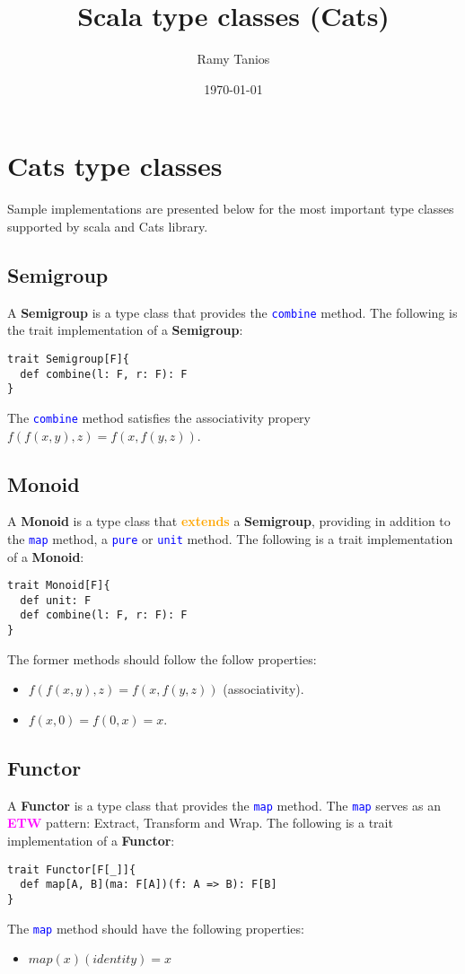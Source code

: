 \documentclass[11pt]{article}
\title{Scala type classes (Cats)}
\author{ Ramy Tanios }
\date{\today}
\newcommand\func[1]{\textcolor{blue}{\texttt{#1}}}
\begin{document}
\maketitle	
\pagebreak


\section{Cats type classes}
Sample implementations are presented below for the most important type classes supported by scala and Cats library.

\subsection{Semigroup}
A \textbf{Semigroup} is a type class that provides the \func{combine} method.
The following is the trait implementation of a \textbf{Semigroup}: 
\begin{lstlisting}[style=myScalastyle]
trait Semigroup[F]{ 
  def combine(l: F, r: F): F
}
\end{lstlisting}
The \func{combine} method satisfies the associativity propery $f(f(x,y), z) = f(x, f(y,z))$. 

\subsection{Monoid}
A \textbf{Monoid} is a type class that \textcolor{orange}{\textbf{extends}} a \textbf{Semigroup}, providing in addition to the 
\func{map} method, a \func{pure} or \func{unit} method. The following is a trait implementation of a \textbf{Monoid}: 
\begin{lstlisting}[style=myScalaStyle]
trait Monoid[F]{ 
  def unit: F 
  def combine(l: F, r: F): F
}
\end{lstlisting}
The former methods should follow the follow properties: 
\begin{itemize}
  \item $f(f(x,y), z) = f(x, f(y,z))$ (associativity). 
  \item $f(x, 0) = f(0, x) = x$. 
\end{itemize}



\subsection{Functor}
A \textbf{Functor} is a type class that provides the \func{map} method. 
The \func{map} serves as an \textcolor{magenta}{\textbf{ETW}} pattern: Extract, Transform and Wrap. The following 
is a trait implementation of a \textbf{Functor}: 
\begin{lstlisting}[style=myScalastyle]
trait Functor[F[_]]{ 
  def map[A, B](ma: F[A])(f: A => B): F[B]
}
\end{lstlisting}
The \func{map} method should have the following properties: 
\begin{itemize}
  \item $map(x)(identity) = x$
\end{itemize}
\end{document}
